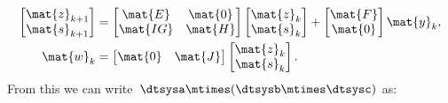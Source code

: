 \begin{equation*}
    \label{eq:dlin-6}
    \begin{aligned}
        \begin{bmatrix}
            \mat{z}_{k+1} \\
            \mat{s}_{k+1}
        \end{bmatrix} & =
        \begin{bmatrix}
            \mat{E}  & \mat{0} \\
            \mat{IG} & \mat{H}
        \end{bmatrix}
        \begin{bmatrix}
            \mat{z}_k \\ \mat{s}_k
        \end{bmatrix}+
        \begin{bmatrix}
            \mat{F} \\ \mat{0}
        \end{bmatrix}\mat{y}_k, \\
        \mat{w}_k        & =
        \begin{bmatrix}
            \mat{0} & \mat{J}
        \end{bmatrix}
        \begin{bmatrix}
            \mat{z}_k \\ \mat{s}_k
        \end{bmatrix}.
    \end{aligned}
\end{equation*}
From this we can write~$\dtsysa\mtimes (\dtsysb\mtimes \dtsysc)$ as:
